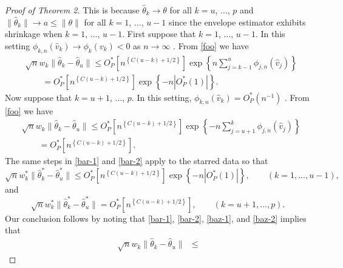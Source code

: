 \documentclass{article}\usepackage[]{graphicx}\usepackage[]{color}
\newcommand{\That}{\widehat{\theta}}
\newcommand{\Tstar}{\widehat{\theta}^{\textstyle{*}}}
\newcommand{\wstar}{w^{\textstyle{*}}}
\newcommand{\rootn}{\sqrt{n}}
\begin{document}
\begin{proof}[Proof of Theorem 2]
This is because $\That_k \to \theta$ for all $k = u$, $\ldots$, $p$ and 
$\|\That_k\| \to a \leq \|\theta\|$ for all $k = 1$, $\ldots$, $u-1$ since the 
envelope estimator exhibits shrinkage when $k = 1$, $\ldots$, $u-1$. First 
suppose that $k = 1$, $\ldots$, $u-1$. In this setting   
$\phi_{k,n}(\hat{v}_k) \to \phi_k(v_k) < 0$ as $n \to \infty$ 
\citep[proof of Theorems 5 and 6]{algo}. From \eqref{foo} we have 
\begin{equation}
\begin{split}
  &\rootn w_k\|\That_k - \That_u\| 
    \leq O_P^{\textstyle{*}}\left[n^{\left\{C(u - k) + 1/2\right\}}\right] 
      \exp\left\{n\sum_{j=k-1}^u \phi_{j,n}(\hat{v}_j)\right\} \\
  &\qquad= O_P^{\textstyle{*}}\left[n^{\left\{C(u - k) + 1/2\right\}}\right]
    \exp\left\{-n|O_P^{\textstyle{*}}(1)|\right\}.
\end{split}
\label{bar-1}
\end{equation}
Now suppose that $k = u+1$, $\ldots$, $p$. In this setting,  
$\phi_{k,n}(\hat{v}_k) = O_P^{\textstyle{*}}\left(n^{-1}\right)$ 
\citep[proof of Theorem 3.1]{zhangmai}. From \eqref{foo} we have 
\begin{equation}
\begin{split}
  &\rootn w_k\|\That_k - \That_u\| 
    \leq O_P^{\textstyle{*}}\left[n^{\left\{C(u - k) + 1/2\right\}}\right] 
      \exp\left\{-n\sum_{j=u+1}^k \phi_{j,n}(\hat{v}_j)\right\} \\
  &\qquad= O_P^{\textstyle{*}}\left[n^{\left\{C(u - k) + 1/2\right\}}\right].
\end{split}
\label{bar-2}
\end{equation}
The same steps in \eqref{bar-1} and \eqref{bar-2} apply to the starred data 
so that  
\begin{equation}
  \rootn \wstar_k\|\Tstar_k - \Tstar_u\| \leq 
    O_P^{\textstyle{*}}\left[n^{\left\{C(u - k) + 1/2\right\}}\right]
      \exp\left\{-n|O_P^{\textstyle{*}}(1)|\right\},
    \qquad (k = 1,...,u-1),
\label{baz-1}
\end{equation}
and
\begin{equation}
  \rootn \wstar_k\|\Tstar_k - \Tstar_u\| = 
    O_P^{\textstyle{*}}\left[n^{\left\{C(u - k) + 1/2\right\}}\right],
    \qquad (k = u+1,...,p).
\label{baz-2}
\end{equation}
Our conclusion follows by noting that \eqref{bar-1}, \eqref{bar-2}, 
\eqref{baz-1}, and \eqref{baz-2} implies that 
\begin{align*}
  \rootn w_k\|\That_k - \That_u\| &\leq 

\end{align*}
\end{proof}
\end{document}
